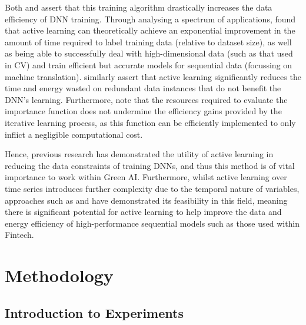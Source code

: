 \documentclass[a4paper, 11pt]{report}
\begin{document}
    Both \citet{ren-2021} and \citet{xu-2021} assert that this training algorithm drastically increases the data efficiency of DNN training. Through analysing a spectrum of applications, \citet{ren-2021} found that active learning can theoretically achieve an exponential improvement in the amount of time required to label training data (relative to dataset size), as well as being able to successfully deal with high-dimensional data (such as that used in CV) and train efficient but accurate models for sequential data (focussing on machine translation). \citet{xu-2021} similarly assert that active learning significantly reduces the time and energy wasted on redundant data instances that do not benefit the DNN's learning. Furthermore, \citet{ren-2021} note that the resources required to evaluate the importance function does not undermine the efficiency gains provided by the iterative learning process, as this function can be efficiently implemented to only inflict a negligible computational cost. 

    Hence, previous research has demonstrated the utility of active learning in reducing the data constraints of training DNNs, and thus this method is of vital importance to work within Green AI. Furthermore, whilst active learning over time series introduces further complexity due to the temporal nature of variables, approaches such as \citet{peng-2017} and \citet{zimmer-2018} have demonstrated its feasibility in this field, meaning there is significant potential for active learning to help improve the data and energy efficiency of high-performance sequential models such as those used within Fintech.


    \newpage
    \chapter{Methodology}
    \label{chapter: experiments}

    \section{Introduction to Experiments}
\end{document}
